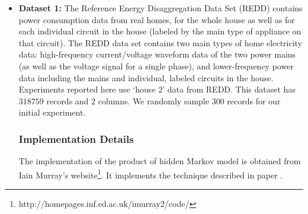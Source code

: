 \documentclass[runningheads,a4paper]{llncs}
\begin{document}
\begin{itemize}
\item \textbf{Dataset 1:} The Reference Energy Disaggregation Data Set (REDD) contains power consumption data from real homes, for the whole house as well as for each individual circuit in
the house (labeled by the main type of appliance on that circuit). %
The REDD data set contains two main types of home electricity data: high-frequency current/voltage waveform data of the two power mains (as well as the voltage signal for a single phase), and lower-frequency power data including the mains and individual, labeled circuits in the house. 
Experiments reported here use `house 2' data from REDD. This dataset has $318759$ records and $2$ columns. We randomly sample $300$ records for our initial experiment.
\subsubsection{Implementation Details}
The implementation of the product of hidden Markov model is obtained from Iain Murray's website\footnote{\label{link}http://homepages.inf.ed.ac.uk/imurray2/code/}. It implements the technique described in paper \cite{hinton2000}.



\end{itemize}
\end{document}
